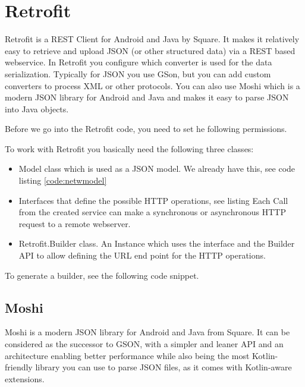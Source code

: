 \section{Retrofit}
Retrofit is a REST Client for Android and Java by Square. It makes it relatively easy to retrieve and upload JSON (or other structured data) via a REST based webservice. In Retrofit you configure which converter is used for the data serialization. Typically for JSON you use GSon, but you can add custom converters to process XML or other protocols. You can also use Moshi which is a modern JSON library for Android and Java and makes it easy to parse JSON into Java objects.

Before we go into the Retrofit code, you need to set he following permissions. 



To work with Retrofit you basically need the following three classes:

\begin{itemize}
	\item Model class which is used as a JSON model. We already have this, see code listing \ref{code:netwmodel}
	\item Interfaces that define the possible HTTP operations, see listing 
	Each Call from the created service can make a synchronous or asynchronous HTTP request to a remote webserver.
	\item Retrofit.Builder class. An Instance which uses the interface and the Builder API to allow defining the URL end point for the HTTP operations.
\end{itemize}




To generate a builder, see the following code snippet.





\subsection{Moshi}
\label{sec:moshi}
Moshi is a modern JSON library for Android and Java from Square. It can be considered as the successor to GSON, with a simpler and leaner API and an architecture enabling better performance while also being the most Kotlin-friendly library you can use to parse JSON files, as it comes with Kotlin-aware extensions.

